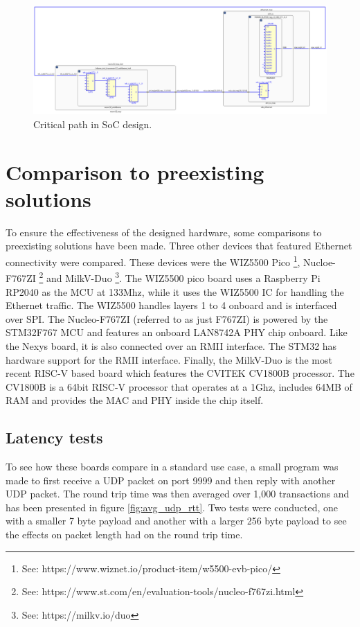 \begin{figure}[h]
    \centering
    \includegraphics[width=1\textwidth]{Images/critical_path_delay_schematic.png}
    \caption[Critical path in SoC design]{Critical path in SoC design.}
    \label{fig:crit_path}
\end{figure}





\section{Comparison to preexisting solutions}

To ensure the effectiveness of the designed hardware, some comparisons to preexisting solutions have been made. Three other devices that featured Ethernet connectivity were compared. These devices were the WIZ5500 Pico \footnote[1]{See: https://www.wiznet.io/product-item/w5500-evb-pico/}, Nucloe-F767ZI \footnote[2]{See: https://www.st.com/en/evaluation-tools/nucleo-f767zi.html} and MilkV-Duo \footnote[3]{See: https://milkv.io/duo}. The WIZ5500 pico board uses a Raspberry Pi RP2040 as the MCU at 133Mhz, while it uses the WIZ5500 IC for handling the Ethernet traffic. The WIZ5500 handles layers 1 to 4 onboard and is interfaced over SPI. The Nucleo-F767ZI (referred to as just F767ZI) is powered by the STM32F767 MCU and features an onboard LAN8742A PHY chip onboard. Like the Nexys board, it is also connected over an RMII interface. The STM32 has hardware support for the RMII interface. Finally, the MilkV-Duo is the most recent RISC-V based board which features the CVITEK CV1800B processor. The CV1800B is a 64bit RISC-V processor that operates at a 1Ghz, includes 64MB of RAM and provides the MAC and PHY inside the chip itself.

\subsection{Latency tests}
To see how these boards compare in a standard use case, a small program was made to first receive a UDP packet on port 9999 and then reply with another UDP packet. The round trip time was then averaged over 1,000 transactions and has been presented in figure \ref{fig:avg_udp_rtt}. Two tests were conducted, one with a smaller 7 byte payload and another with a larger 256 byte payload to see the effects on packet length had on the round trip time. 

